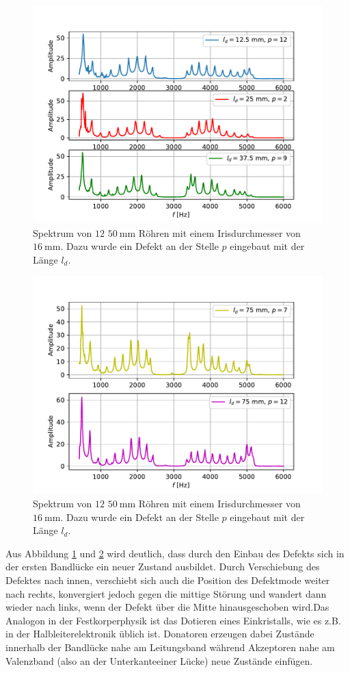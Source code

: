 \begin{figure}
  \centering
  \includegraphics[scale=0.5]{Messwerte/plot18.pdf}
  \caption{Spektrum von $12$ $\SI{50}{\milli\meter}$ Röhren mit einem Irisdurchmesser von $\SI{16}{\milli\meter}$. Dazu wurde ein Defekt an der Stelle $p$ eingebaut
  mit der Länge $l_d$.}
  \label{fig:plot18}
\end{figure}
\begin{figure}
  \centering
  \includegraphics[scale=0.5]{Messwerte/plot19.pdf}
  \caption{Spektrum von $12$ $\SI{50}{\milli\meter}$ Röhren mit einem Irisdurchmesser von $\SI{16}{\milli\meter}$. Dazu wurde ein Defekt an der Stelle $p$ eingebaut
  mit der Länge $l_d$.}
  \label{fig:plot19}
\end{figure}
Aus Abbildung \ref{fig:plot18} und \ref{fig:plot19} wird deutlich, dass durch den Einbau des Defekts sich in der ersten Bandlücke ein neuer Zustand ausbildet.
Durch Verschiebung des Defektes nach innen, verschiebt sich auch die Position des Defektmode weiter nach rechts, konvergiert jedoch gegen die mittige Störung und wandert
dann wieder nach links, wenn der Defekt über die Mitte hinausgeschoben wird.Das Analogon in der Festkorperphysik ist das Dotieren eines Einkristalls, wie es z.B. in der
Halbleiterelektronik üblich ist. Donatoren erzeugen dabei Zustände innerhalb der Bandlücke nahe am Leitungsband während Akzeptoren nahe am Valenzband
(also an der Unterkanteeiner Lücke) neue Zustände einfügen.
